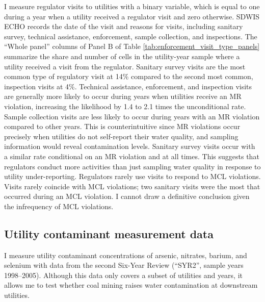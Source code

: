 \documentclass[12pt]{article}
\newcommand{\outputdir}{../../output}
\newcommand{\outsum}[1]{}
\begin{document}



I measure regulator visits to utilities with a binary variable, which is equal to one during a year when a utility received a regulator visit and zero otherwise. SDWIS ECHO records the date of the visit and reasons for visits, including sanitary survey, technical assistance, enforcement, sample collection, and inspections. The ``Whole panel'' columns of Panel B of Table \ref{tab:enforcement_visit_type_panels} summarize the share and number of cells in the utility-year sample where a utility received a visit from the regulator. Sanitary survey visits are the most common type of regulatory visit at 14\% compared to the second most common, inspection visits at 4\%. Technical assistance, enforcement, and inspection visits are generally more likely to occur during years when utilities receive an MR violation, increasing the likelihood by 1.4 to 2.1 times the unconditional rate. Sample collection visits are less likely to occur during years with an MR violation compared to other years. This is counterintuitive since MR violations occur precisely when utilities do not self-report their water quality, and sampling information would reveal contamination levels. Sanitary survey visits occur with a similar rate conditional on an MR violation and at all times. This suggests that regulators conduct more activities than just sampling water quality in response to utility under-reporting. Regulators rarely use visits to respond to MCL violations. Visits rarely coincide with MCL violations; two sanitary visits were the most that occurred during an MCL violation. I cannot draw a definitive conclusion given the infrequency of MCL violations.

\subsection{Utility contaminant measurement data}

I measure utility contaminant concentrations of arsenic, nitrates, barium, and selenium with data from the second Six-Year Review (``SYR2'', sample years 1998--2005). Although this data only covers a subset of utilities and years, it allows me to test whether coal mining raises water contamination at downstream utilities.
\end{document}
